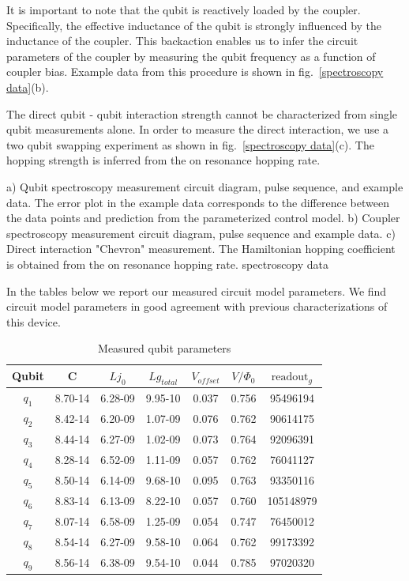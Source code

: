 It is important to note that the qubit is reactively loaded by the coupler.
Specifically, the effective inductance of the qubit is strongly influenced by the inductance of the coupler.
This backaction enables us to infer the circuit parameters of the coupler by measuring the qubit frequency as a function of coupler bias.
Example data from this procedure is shown in fig.~\ref{spectroscopy data}(b).

The direct qubit - qubit interaction strength cannot be characterized from single qubit measurements alone.
In order to measure the direct interaction, we use a two qubit swapping experiment as shown in fig.~\ref{spectroscopy data}(c).
The hopping strength is inferred from the on resonance hopping rate.

{
a) Qubit spectroscopy measurement circuit diagram, pulse sequence, and example data.
The error plot in the example data corresponds to the difference between the data points and prediction from the parameterized control model.
b) Coupler spectroscopy measurement circuit diagram, pulse sequence and example data.
c) Direct interaction "Chevron" measurement.  The Hamiltonian hopping coefficient is obtained from the on resonance hopping rate.
}
{spectroscopy data}

In the tables below we report our measured circuit model parameters.
We find circuit model parameters in good agreement with previous characterizations of this device.\cite{Neill2018}
\begin{table}
    \caption{Measured qubit parameters}
    \centering
    \begin{tabular}{ c c c c c c c}
        \hline \hline
        Qubit & C & $Lj_{0}$ & $Lg_{total}$ & $V_{offset}$ & $V/ \Phi_{0}$ & $\text{readout}_{g}$ \\
        \hline
        $q_1$ & 8.70-14 & 6.28-09 & 9.95-10 & 0.037 & 0.756 & 95496194  \\
        $q_2$ & 8.42-14 & 6.20-09 & 1.07-09 & 0.076 & 0.762 & 90614175  \\
        $q_3$ & 8.44-14 & 6.27-09 & 1.02-09 & 0.073 & 0.764 & 92096391  \\
        $q_4$ & 8.28-14 & 6.52-09 & 1.11-09 & 0.057 & 0.762 & 76041127  \\
        $q_5$ & 8.50-14 & 6.14-09 & 9.68-10 & 0.095 & 0.763 & 93350116  \\
        $q_6$ & 8.83-14 & 6.13-09 & 8.22-10 & 0.057 & 0.760 & 105148979 \\
        $q_7$ & 8.07-14 & 6.58-09 & 1.25-09 & 0.054 & 0.747 & 76450012  \\
        $q_8$ & 8.54-14 & 6.27-09 & 9.58-10 & 0.064 & 0.762 & 99173392  \\
        $q_9$ & 8.56-14 & 6.38-09 & 9.54-10 & 0.044 & 0.785 & 97020320  \\
        \hline
    \end{tabular}
    \label{table:Qubit Parameters}
\end{table}

